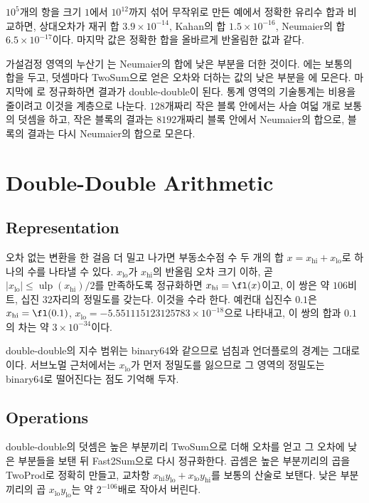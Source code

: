 $10^5$개의 항을 크기 $1$에서 $10^{12}$까지 섞어 무작위로 만든 예에서 정확한 유리수 합과 비교하면, 상대오차가 재귀 합 $3.9\times10^{-14}$, Kahan의 합 $1.5\times10^{-16}$, Neumaier의 합 $6.5\times10^{-17}$이다. 마지막 값은 정확한 합을 올바르게 반올림한 값과 같다.

\begin{instardust}
가설검정 영역의 누산기 는 Neumaier의 합에 낮은 부분을 더한 것이다. 에는 보통의 합을 두고, 덧셈마다 TwoSum으로 얻은 오차와 더하는 값의 낮은 부분을 에 모은다. 마지막에 로 정규화하면 결과가 double-double이 된다. 통계 영역의 기술통계는 비용을 줄이려고 이것을 계층으로 나눈다. $128$개짜리 작은 블록 안에서는 사슬 여덟 개로 보통의 덧셈을 하고, 작은 블록의 결과는 $8192$개짜리 블록 안에서 Neumaier의 합으로, 블록의 결과는 다시 Neumaier의 합으로 모은다.
\end{instardust}

\section{Double-Double Arithmetic}
\label{sec:double-double}

\subsection{Representation}

오차 없는 변환을 한 걸음 더 밀고 나가면 부동소수점 수 두 개의 합 $x=x_{\mathrm{hi}}+x_{\mathrm{lo}}$로 하나의 수를 나타낼 수 있다. $x_{\mathrm{lo}}$가 $x_{\mathrm{hi}}$의 반올림 오차 크기 이하, 곧 $|x_{\mathrm{lo}}|\le\operatorname{ulp}(x_{\mathrm{hi}})/2$를 만족하도록 정규화하면 $x_{\mathrm{hi}}=\fl(x)$이고, 이 쌍은 약 $106$비트, 십진 $32$자리의 정밀도를 갖는다. 이것을  수라 한다. 예컨대 십진수 $0.1$은 $x_{\mathrm{hi}}=\fl(0.1)$, $x_{\mathrm{lo}}=-5.551115123125783\times10^{-18}$으로 나타내고, 이 쌍의 합과 $0.1$의 차는 약 $3\times10^{-34}$이다.

double-double의 지수 범위는 binary64와 같으므로 넘침과 언더플로의 경계는 그대로이다. 서브노멀 근처에서는 $x_{\mathrm{lo}}$가 먼저 정밀도를 잃으므로 그 영역의 정밀도는 binary64로 떨어진다는 점도 기억해 두자.

\subsection{Operations}

double-double의 덧셈은 높은 부분끼리 TwoSum으로 더해 오차를 얻고 그 오차에 낮은 부분들을 보탠 뒤 Fast2Sum으로 다시 정규화한다. 곱셈은 높은 부분끼리의 곱을 TwoProd로 정확히 만들고, 교차항 $x_{\mathrm{hi}}y_{\mathrm{lo}}+x_{\mathrm{lo}}y_{\mathrm{hi}}$를 보통의 산술로 보탠다. 낮은 부분끼리의 곱 $x_{\mathrm{lo}}y_{\mathrm{lo}}$는 약 $2^{-106}$배로 작아서 버린다.

